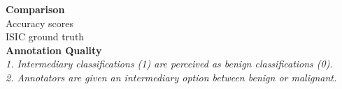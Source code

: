 \documentclass[../presentation.tex]{subfiles}
\begin{document}
\twocolumn
\null
\vfill

\large{\textbf{Comparison}} \\
\large{Accuracy scores} \\
\large{ISIC ground truth} \\

\large{\textbf{Annotation Quality}} \\
\large{\textit{1. Intermediary classifications (1) are perceived as benign classifications (0).}} \\
\large{\textit{2. Annotators are given an intermediary option between benign or malignant.}}

\vfill
\pagebreak
\null
\vfill

\begin{table}[H]
\raggedleft
{}
\caption*{}
\end{table}

\begin{table}[H]
\raggedleft
{}
\caption*{}
\end{table}

\vfill
\onecolumn
\end{document}
